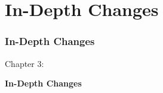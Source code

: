 %

\section{In-Depth Changes}
\begin{frame}[fragile]
	\frametitle{In-Depth Changes}

	\begin{center}\huge{Chapter 3:}\end{center}
	\begin{center}\huge{\color{typo3darkgrey}\textbf{In-Depth Changes}}\end{center}

\end{frame}


